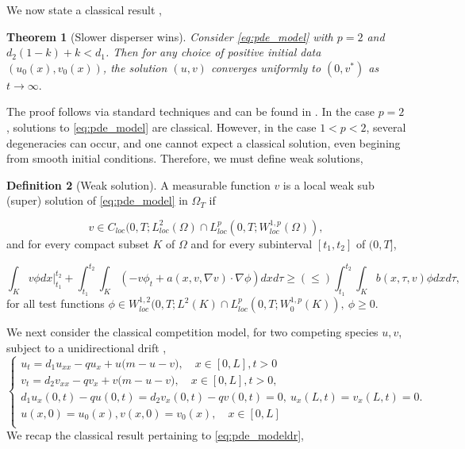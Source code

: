 \documentclass[10pt]{amsart}
\theoremstyle{plain}
\newtheorem{theorem}{Theorem}[section]
\theoremstyle{definition}
\newtheorem{definition}[theorem]{Definition}
\begin{document}
We now state a classical result \cite{dockery1998evolution},
\begin{theorem}[Slower disperser wins]
\label{thm:classic_pde}
Consider \eqref{eq:pde_model} with $p=2$ and  \newline $d_2(1-k) + k < d_1$. Then for any choice of positive initial data $(u_0(x),v_0(x))$, the solution $(u,v)$ converges uniformly to $(0,v^{*})$ as $t\to \infty.$
\end{theorem}
\noindent The proof follows via standard techniques and can be found in \cite{dockery1998evolution, ni2011mathematics}.
In the case $p=2$, solutions to \eqref{eq:pde_model} are classical. However, in the case $1<p<2$, several degeneracies can occur, and one cannot expect a classical solution, even begining from smooth initial conditions. Therefore, we must define weak solutions,

\begin{definition}[Weak solution]\label{def:weak}
A measurable function $v$ is a local weak sub (super) solution of \eqref{eq:pde_model} in $\Omega_{T}$ if 

\begin{equation}
v \in C_{loc}(0,T;L^{2}_{loc}(\Omega) \cap L^{p}_{loc}(0,T;W^{1,p}_{loc}(\Omega) ),
\end{equation}
and for every compact subset $K$ of $\Omega$ and for every subinterval $[t_{1},t_{2}]$ of $(0,T]$,

\begin{equation}
\int_{K} v \phi dx \vert^{t_{2}}_{t_{1}}  + \int^{t_{2}}_{t_{1}} \int_{K} \left(   -v \phi_{t}   +  a(x,v,\nabla v) \cdot \nabla \phi    \right) dx d \tau\geq (\leq)  \int^{t_{2}}_{t_{1}} \int_{K}  b(x,\tau,v) \phi dx d \tau,
\end{equation}
for all test functions $\phi \in W^{1,2}_{loc}(0,T;L^{2}(K) \cap L^{p}_{loc}(0,T;W^{1,p}_{0}(K) ), \ \phi \geq 0$. 
\end{definition}

We next consider the classical competition model, for two competing species $u,v$, subject to a unidirectional drift \cite{lou2014evolution},
\begin{equation}
\label{eq:pde_modeldr}
\left\{ \begin{array}{ll}
u_t = d_1 u_{xx} -q u_x +  u\Big(m-u-v\Big), \quad x\in [0,L], t>0\\
		v_t = d_2 v_{xx} -q v_x  + v\Big(m-u-v\Big), \quad x\in [0,L],t>0, \\
	   d_{1}u_{x}(0,t) - qu(0,t) = d_{2}v_{x}(0,t) - qv(0,t) = 0 , \ u_{x}(L,t)  = v_{x}(L,t) = 0. \\
		u(x,0)=u_0(x), v(x,0)=v_{0} (x), \quad x\in [0,L] \\
\end{array}\right.
\end{equation}
%
    We recap the classical result \cite{lou2014evolution} pertaining to \eqref{eq:pde_modeldr},
\end{document}
